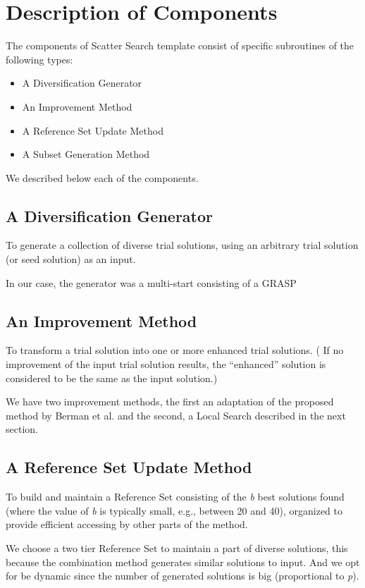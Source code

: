 \section{Description of Components}
The components of Scatter Search template \cite{glover1998template}
consist of
specific subroutines of the following types:
\begin{itemize}
\item A Diversification Generator
\item An Improvement Method
\item A Reference Set Update Method
\item A Subset Generation Method
\end{itemize}
We described below
each of the components.

\subsection{A Diversification Generator}
To generate
a collection of diverse trial solutions,
using an arbitrary trial solution
(or seed solution) as an input.

In our case,
the generator was a multi-start
consisting of a GRASP


\subsection{An Improvement Method}
To transform
a trial solution
into one or more enhanced trial solutions. 
(
If no improvement
of the input trial solution results, 
the ``enhanced'' solution
is considered to be
the same as the input solution.)

We have two improvement methods,
the first an adaptation
of the proposed method by Berman et al. \cite{berman1987stochastic}
and the second,
a Local Search
described in the next section.

\subsection{A Reference Set Update Method}
To build and maintain a Reference Set
consisting of the \textit{b} best solutions found
(where the value of \textit{b}
is typically small,
e.g., between 20 and 40),
organized to provide efficient accessing
by other parts of the method.

We choose
a two tier Reference Set
to maintain a part of diverse solutions,
this because the combination method
generates similar solutions to input.
And we opt for be dynamic
since the number
of generated solutions
is big (proportional to \textit{p}).

